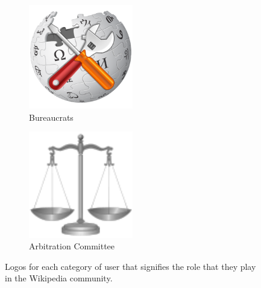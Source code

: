 \begin{figure}[h!]
    \begin{subfigure}[b]{0.49\textwidth}
        \centering
        \includegraphics[width=0.5\textwidth]{images/bureaucrat.png}
        \caption{Bureaucrats}
        \label{fig:crats}
    \end{subfigure}
    \begin{subfigure}[b]{0.49\textwidth}
        \centering
        \includegraphics[width=0.5\textwidth]{images/arbcom.png}
        \caption{Arbitration Committee}
        \label{fig:arbs}
    \end{subfigure}
    \caption{Logos for each category of user that signifies the role that they play in the Wikipedia community.}
    \label{fig:logos}
\end{figure}

